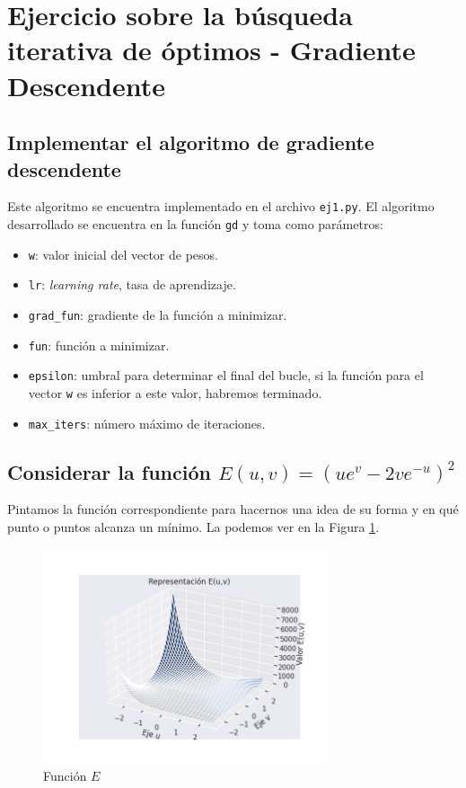 \documentclass[a4paper, 20pt]{article}
\begin{document}
\large
\section{Ejercicio sobre la búsqueda iterativa de óptimos - Gradiente Descendente}
\subsection{Implementar el algoritmo de gradiente descendente}
Este algoritmo se encuentra implementado en el archivo \texttt{ej1.py}. El algoritmo desarrollado se encuentra en la función \texttt{gd} y toma como parámetros:

\begin{itemize}
\item \texttt{w}: valor inicial del vector de pesos.
\item \texttt{lr}: \textit{learning rate}, tasa de aprendizaje.
\item \texttt{grad\_fun}: gradiente de la función a minimizar.
\item \texttt{fun}: función a minimizar.
\item \texttt{epsilon}: umbral para determinar el final del bucle, si la función para el vector \texttt{w} es inferior a este valor, habremos terminado.
\item \texttt{max\_iters}: número máximo de iteraciones.
\end{itemize}

\subsection{Considerar la función $E(u,v) = (ue^v - 2ve^{-u})^2$}
Pintamos la función correspondiente para hacernos una idea de su forma y en qué punto o puntos alcanza un mínimo. La podemos ver en la Figura \ref{fig:E}.

\begin{figure}[H]
    \centering
    \includegraphics[width=0.75\textwidth]{e1}
    \caption{Función $E$}
    \label{fig:E}
\end{figure}
\end{document}
